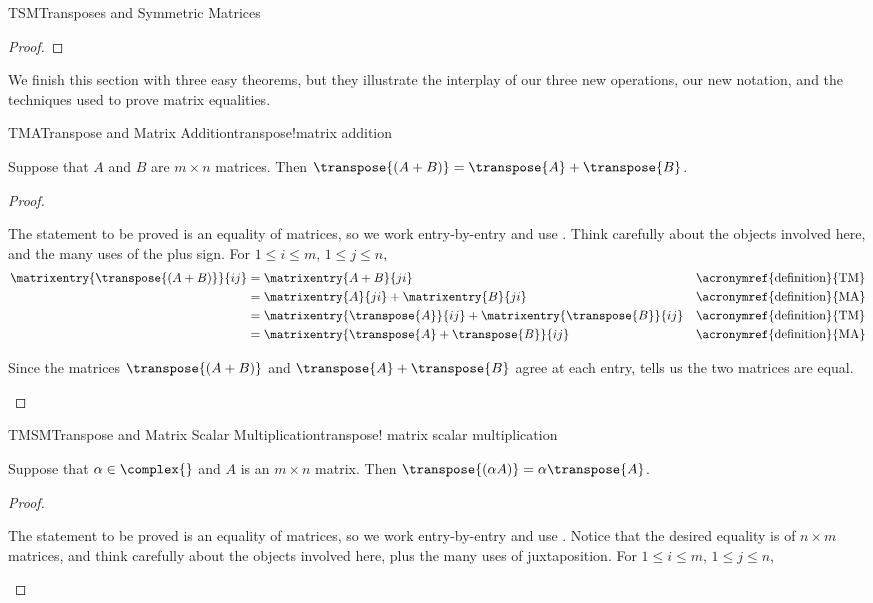 \begin{subsect}{TSM}{Transposes and Symmetric Matrices}
\begin{proof}
\end{proof}
%
\begin{para}We finish this section with three easy theorems, but they illustrate the interplay of our three new operations, our new notation, and the techniques used to prove matrix equalities.\end{para}
%
\begin{theorem}{TMA}{Transpose and Matrix Addition}{transpose!matrix addition}
\begin{para}Suppose that $A$ and $B$ are $m\times n$ matrices.  Then  $\transpose{(A+B)}=\transpose{A}+\transpose{B}$.\end{para}
%
\end{theorem}
%
\begin{proof}
\begin{para}The statement  to be proved is an equality of matrices, so we work entry-by-entry and use .  Think carefully about the objects involved here, and the many uses of the plus sign.  For $1\leq i\leq m$, $1\leq j\leq n$,
%
\begin{align*}
\matrixentry{\transpose{(A+B)}}{ij}
&=\matrixentry{A+B}{ji}&&\text{\acronymref{definition}{TM}}\\
&=\matrixentry{A}{ji}+\matrixentry{B}{ji}&&\text{\acronymref{definition}{MA}}\\
&=\matrixentry{\transpose{A}}{ij}+\matrixentry{\transpose{B}}{ij}&&\text{\acronymref{definition}{TM}}\\
&=\matrixentry{\transpose{A}+\transpose{B}}{ij}&&\text{\acronymref{definition}{MA}}
%
\end{align*}
\end{para}
%
\begin{para}Since the matrices $\transpose{(A+B)}$ and $\transpose{A}+\transpose{B}$ agree at each entry,  tells us the two matrices are equal.\end{para}
%
\end{proof}
%
\begin{theorem}{TMSM}{Transpose and Matrix Scalar Multiplication}{transpose! matrix scalar multiplication}
\begin{para}Suppose that $\alpha\in\complex{\null}$ and $A$ is an $m\times n$ matrix.  Then $\transpose{(\alpha A)}=\alpha\transpose{A}$.\end{para}
%
\end{theorem}
%
\begin{proof}
\begin{para}The statement  to be proved is an equality of matrices, so we work entry-by-entry and use .  Notice that the desired equality is of $n\times m$ matrices, and think carefully about the objects involved here, plus the many uses of juxtaposition.  For $1\leq i\leq m$, $1\leq j\leq n$,

\end{para}
\end{proof}
\end{subsect}
